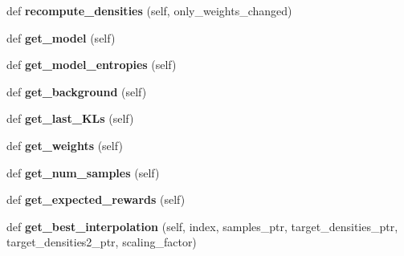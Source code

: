 \begin{DoxyCompactItemize}
\item 
def {\bfseries recompute\+\_\+densities} (self, only\+\_\+weights\+\_\+changed)\hypertarget{classVIPS__PythonWrapper_1_1VIPS__PythonWrapper_af2603b54ce5770f30caaaedd0de39903}{}\label{classVIPS__PythonWrapper_1_1VIPS__PythonWrapper_af2603b54ce5770f30caaaedd0de39903}

\item 
def {\bfseries get\+\_\+model} (self)\hypertarget{classVIPS__PythonWrapper_1_1VIPS__PythonWrapper_a829dfd6a3314459908c09b0e717f7131}{}\label{classVIPS__PythonWrapper_1_1VIPS__PythonWrapper_a829dfd6a3314459908c09b0e717f7131}

\item 
def {\bfseries get\+\_\+model\+\_\+entropies} (self)\hypertarget{classVIPS__PythonWrapper_1_1VIPS__PythonWrapper_a095632bb9095f5c4807fd54cb1918ee0}{}\label{classVIPS__PythonWrapper_1_1VIPS__PythonWrapper_a095632bb9095f5c4807fd54cb1918ee0}

\item 
def {\bfseries get\+\_\+background} (self)\hypertarget{classVIPS__PythonWrapper_1_1VIPS__PythonWrapper_a31e9cc51294fd3ab82ead87a0bb8d98f}{}\label{classVIPS__PythonWrapper_1_1VIPS__PythonWrapper_a31e9cc51294fd3ab82ead87a0bb8d98f}

\item 
def {\bfseries get\+\_\+last\+\_\+\+K\+Ls} (self)\hypertarget{classVIPS__PythonWrapper_1_1VIPS__PythonWrapper_ad53604dce23194b124639174202748fb}{}\label{classVIPS__PythonWrapper_1_1VIPS__PythonWrapper_ad53604dce23194b124639174202748fb}

\item 
def {\bfseries get\+\_\+weights} (self)\hypertarget{classVIPS__PythonWrapper_1_1VIPS__PythonWrapper_a4644ee0e89e0257ea9b412282087812d}{}\label{classVIPS__PythonWrapper_1_1VIPS__PythonWrapper_a4644ee0e89e0257ea9b412282087812d}

\item 
def {\bfseries get\+\_\+num\+\_\+samples} (self)\hypertarget{classVIPS__PythonWrapper_1_1VIPS__PythonWrapper_a62bbfe8bb77f11f74e22df9a0820c441}{}\label{classVIPS__PythonWrapper_1_1VIPS__PythonWrapper_a62bbfe8bb77f11f74e22df9a0820c441}

\item 
def {\bfseries get\+\_\+expected\+\_\+rewards} (self)\hypertarget{classVIPS__PythonWrapper_1_1VIPS__PythonWrapper_adbaec109e7405288175ca97a62062b54}{}\label{classVIPS__PythonWrapper_1_1VIPS__PythonWrapper_adbaec109e7405288175ca97a62062b54}

\item 
def {\bfseries get\+\_\+best\+\_\+interpolation} (self, index, samples\+\_\+ptr, target\+\_\+densities\+\_\+ptr, target\+\_\+densities2\+\_\+ptr, scaling\+\_\+factor)\hypertarget{classVIPS__PythonWrapper_1_1VIPS__PythonWrapper_acba6adf82d0a8c9d93d97dee8b004ba1}{}\label{classVIPS__PythonWrapper_1_1VIPS__PythonWrapper_acba6adf82d0a8c9d93d97dee8b004ba1}


\end{DoxyCompactItemize}
